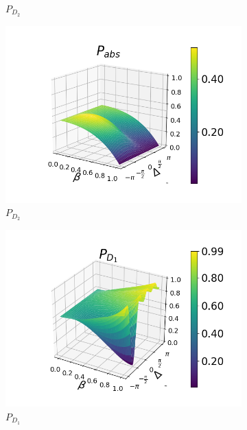 \documentclass[12pt]{book}
\begin{document}
\begin{figure}[H]
\begin{subfigure}[b]{0.3\linewidth}
\caption{$P_{D_{2}}$ }
\label{fig:BS1}
\end{subfigure}
\begin{subfigure}[b]{0.3\linewidth}
\includegraphics[width=\linewidth]{images/pabs_3.png}
\caption{$P_{D_{2}}$ }
\label{fig:BS1}
\end{subfigure}
\begin{subfigure}[b]{0.3\linewidth}
\includegraphics[width=\linewidth]{images/pd1_5.png}
\caption{$P_{D_{1}}$ }
\label{fig:BS1}
\end{subfigure}
\begin{subfigure}[b]{0.3\linewidth}

\end{subfigure}
\end{figure}
\end{document}

